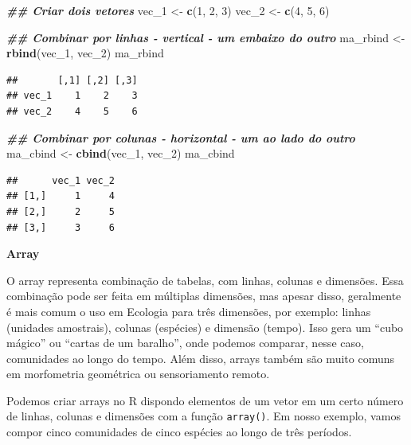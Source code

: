 \documentclass[
]{article}
\newenvironment{Shaded}{\begin{snugshade}}{\end{snugshade}}
\newcommand{\DecValTok}[1]{\textcolor[rgb]{0.00,0.00,0.81}{#1}}
\newcommand{\DocumentationTok}[1]{\textcolor[rgb]{0.56,0.35,0.01}{\textbf{\textit{#1}}}}
\newcommand{\FunctionTok}[1]{\textcolor[rgb]{0.13,0.29,0.53}{\textbf{#1}}}
\newcommand{\NormalTok}[1]{#1}
\newcommand{\OtherTok}[1]{\textcolor[rgb]{0.56,0.35,0.01}{#1}}
\begin{document}
\begin{Shaded}
\begin{Highlighting}[]
\DocumentationTok{\#\# Criar dois vetores}
\NormalTok{vec\_1 }\OtherTok{\textless{}{-}} \FunctionTok{c}\NormalTok{(}\DecValTok{1}\NormalTok{, }\DecValTok{2}\NormalTok{, }\DecValTok{3}\NormalTok{)}
\NormalTok{vec\_2 }\OtherTok{\textless{}{-}} \FunctionTok{c}\NormalTok{(}\DecValTok{4}\NormalTok{, }\DecValTok{5}\NormalTok{, }\DecValTok{6}\NormalTok{)}

\DocumentationTok{\#\# Combinar por linhas {-} vertical {-} um embaixo do outro}
\NormalTok{ma\_rbind }\OtherTok{\textless{}{-}} \FunctionTok{rbind}\NormalTok{(vec\_1, vec\_2)}
\NormalTok{ma\_rbind}
\end{Highlighting}
\end{Shaded}

\begin{verbatim}
##       [,1] [,2] [,3]
## vec_1    1    2    3
## vec_2    4    5    6
\end{verbatim}

\begin{Shaded}
\begin{Highlighting}[]
\DocumentationTok{\#\# Combinar por colunas {-} horizontal {-} um ao lado do outro}
\NormalTok{ma\_cbind }\OtherTok{\textless{}{-}} \FunctionTok{cbind}\NormalTok{(vec\_1, vec\_2)}
\NormalTok{ma\_cbind}
\end{Highlighting}
\end{Shaded}

\begin{verbatim}
##      vec_1 vec_2
## [1,]     1     4
## [2,]     2     5
## [3,]     3     6
\end{verbatim}

\textbf{Array}

O array representa combinação de tabelas, com linhas, colunas e dimensões. Essa combinação pode ser feita em múltiplas dimensões, mas apesar disso, geralmente é mais comum o uso em Ecologia para três dimensões, por exemplo: linhas (unidades amostrais), colunas (espécies) e dimensão (tempo). Isso gera um ``cubo mágico'' ou ``cartas de um baralho'', onde podemos comparar, nesse caso, comunidades ao longo do tempo. Além disso, arrays também são muito comuns em morfometria geométrica ou sensoriamento remoto.

Podemos criar arrays no R dispondo elementos de um vetor em um certo número de linhas, colunas e dimensões com a função \texttt{array()}. Em nosso exemplo, vamos compor cinco comunidades de cinco espécies ao longo de três períodos.
\end{document}
